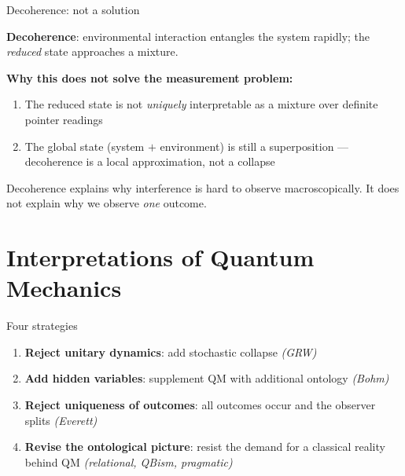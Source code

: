 \documentclass[fleql]{beamer}
\newcommand{\kw}[1]{\textbf{#1}}
\begin{document}
\begin{frame}{Decoherence: not a solution}

  \kw{Decoherence}: environmental interaction entangles the system
  rapidly; the \emph{reduced} state approaches a mixture.

  \vspace{0.5em}
  \textbf{Why this does not solve the measurement problem:}
  \begin{enumerate}
  \item The reduced state is not \emph{uniquely} interpretable as
    a mixture over definite pointer readings
  \item The global state (system $+$ environment) is still a
    superposition --- decoherence is a local approximation,
    not a collapse
  \end{enumerate}

  \vspace{0.3em}
  \small Decoherence explains why interference is hard to observe
  macroscopically. It does not explain why we observe \emph{one}
  outcome.

\end{frame}

\section{Interpretations of Quantum Mechanics}

\begin{frame}{Four strategies}

  \begin{enumerate}
  \item \kw{Reject unitary dynamics}: add stochastic collapse
    \emph{(GRW)}
  \item \kw{Add hidden variables}: supplement QM with additional
    ontology \emph{(Bohm)}
  \item \kw{Reject uniqueness of outcomes}: all outcomes occur and the
    observer splits \emph{(Everett)}
  \item \kw{Revise the ontological picture}: resist the demand for
    a classical reality behind QM
    \emph{(relational, QBism, pragmatic)}
  \end{enumerate}

\end{frame}
\end{document}
